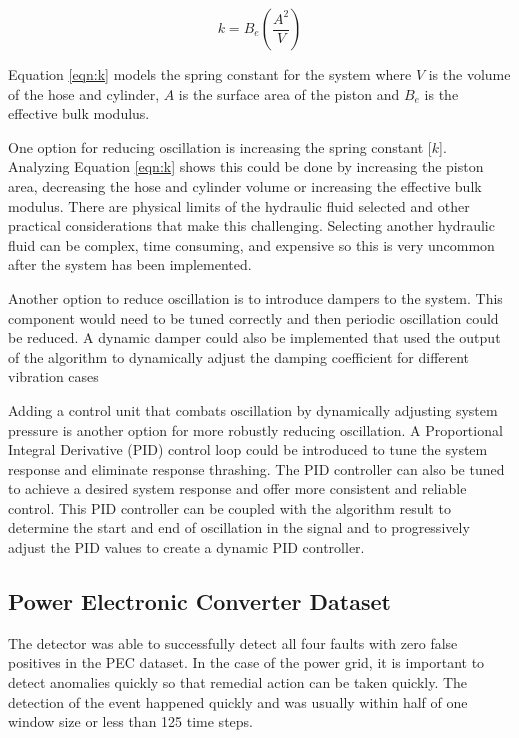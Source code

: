 \begin{equation}
    k = B_e \left ( \frac{A^2}{V} \right)
    \label{eqn:k}
\end{equation}

Equation \eqref{eqn:k} models the spring constant for the system where $V$ is the volume of the hose and cylinder, $A$ is the surface area of the piston and $B_e$ is the effective bulk modulus. 

One option for reducing oscillation is increasing the spring constant [$k$]. Analyzing Equation \eqref{eqn:k} shows this could be done by increasing the piston area, decreasing the hose and cylinder volume or increasing the effective bulk modulus. There are physical limits of the hydraulic fluid selected and other practical considerations that make this challenging. Selecting another hydraulic fluid can be complex, time consuming, and expensive so this is very uncommon after the system has been implemented. 

Another option to reduce oscillation is to introduce dampers to the system. This component would need to be tuned correctly and then periodic oscillation could be reduced. A dynamic damper could also be implemented that used the output of the algorithm to dynamically adjust the damping coefficient for different vibration cases 

Adding a control unit that combats oscillation by dynamically adjusting system pressure is another option for more robustly reducing oscillation. A Proportional Integral Derivative (PID) control loop could be introduced to tune the system response and eliminate response thrashing. The PID controller can also be tuned to achieve a desired system response and offer more consistent and reliable control. This PID controller can be coupled with the algorithm result to determine the start and end of oscillation in the signal and to progressively adjust the PID values to create a dynamic PID controller.


\subsection{Power Electronic Converter Dataset}

The detector was able to successfully detect all four faults with zero false positives in the PEC dataset. In the case of the power grid, it is important to detect anomalies quickly so that remedial action can be taken quickly. The detection of the event happened quickly and was usually within half of one window size or less than 125 time steps.

